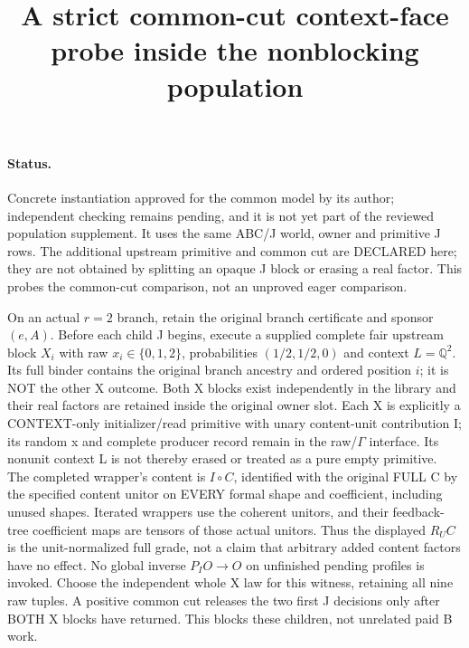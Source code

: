 \documentclass{article}\usepackage{amsmath,amssymb,amsthm}
\title{A strict common-cut context-face probe inside the nonblocking population}
\begin{document}
\maketitle
\paragraph{Status.} Concrete instantiation approved for the common model by its author; independent checking remains pending, and it is not yet part of the reviewed population supplement. It uses the same ABC/J world, owner and primitive J rows. The additional upstream primitive and common cut are DECLARED here; they are not obtained by splitting an opaque J block or erasing a real factor. This probes the common-cut comparison, not an unproved eager comparison.

On an actual $r=2$ branch, retain the original branch certificate and sponsor $(e,A)$. Before each child J begins, execute a supplied complete fair upstream block $X_i$ with raw $x_i\in\{0,1,2\}$, probabilities $(1/2,1/2,0)$ and context $L=\mathbb Q^2$. Its full binder contains the original branch ancestry and ordered position $i$; it is NOT the other X outcome. Both X blocks exist independently in the library and their real factors are retained inside the original owner slot. Each X is explicitly a CONTEXT-only initializer/read primitive with unary content-unit contribution I; its random x and complete producer record remain in the raw/\(\Gamma\) interface. Its nonunit context L is not thereby erased or treated as a pure empty primitive. The completed wrapper's content is \(I\circ C\), identified with the original FULL C by the specified content unitor on EVERY formal shape and coefficient, including unused shapes. Iterated wrappers use the coherent unitors, and their feedback-tree coefficient maps are tensors of those actual unitors. Thus the displayed \(R_UC\) is the unit-normalized full grade, not a claim that arbitrary added content factors have no effect. No global inverse \(P_I O\to O\) on unfinished pending profiles is invoked. Choose the independent whole X law for this witness, retaining all nine raw tuples. A positive common cut releases the two first J decisions only after BOTH X blocks have returned. This blocks these children, not unrelated paid B work.
\end{document}
